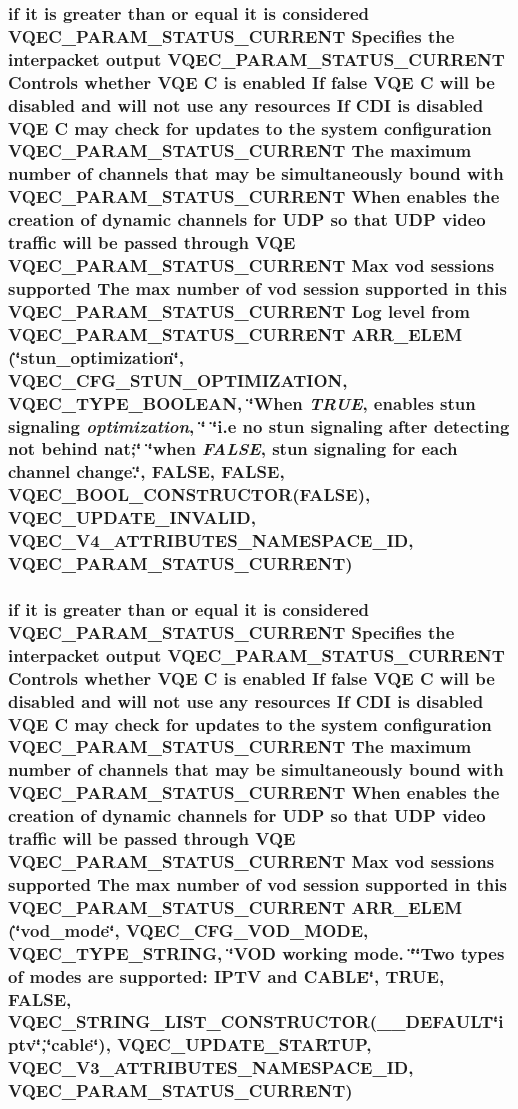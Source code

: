 \subsubsection{\setlength{\rightskip}{0pt plus 5cm}if it is greater than or equal it is considered VQEC\_\-PARAM\_\-STATUS\_\-CURRENT Specifies the interpacket output VQEC\_\-PARAM\_\-STATUS\_\-CURRENT Controls whether VQE \bf{C} is enabled If false VQE \bf{C} will be disabled and will not use any resources If CDI is disabled VQE \bf{C} may check for updates \bf{to} the system configuration VQEC\_\-PARAM\_\-STATUS\_\-CURRENT The maximum number of \bf{channels} that may be simultaneously bound with VQEC\_\-PARAM\_\-STATUS\_\-CURRENT When enables the creation of dynamic \bf{channels} for UDP so that UDP video traffic will be passed through VQE VQEC\_\-PARAM\_\-STATUS\_\-CURRENT Max vod sessions supported The max number of vod session supported in \bf{this} VQEC\_\-PARAM\_\-STATUS\_\-CURRENT Log level from VQEC\_\-PARAM\_\-STATUS\_\-CURRENT ARR\_\-ELEM (\char`\"{}stun\_\-optimization\char`\"{}, VQEC\_\-CFG\_\-STUN\_\-OPTIMIZATION, \bf{VQEC\_\-TYPE\_\-BOOLEAN}, \char`\"{}When  {\em TRUE}, enables stun signaling {\em optimization}, \char`\"{} \char`\"{}i.e no stun signaling after detecting not behind nat;\char`\"{} \char`\"{}when {\em FALSE}, stun signaling for each channel change.\char`\"{}, \bf{FALSE}, \bf{FALSE}, VQEC\_\-BOOL\_\-CONSTRUCTOR(\bf{FALSE}), \bf{VQEC\_\-UPDATE\_\-INVALID}, \bf{VQEC\_\-V4\_\-ATTRIBUTES\_\-NAMESPACE\_\-ID}, VQEC\_\-PARAM\_\-STATUS\_\-CURRENT)}\label{vqec__cfg__settings_8h_ac293a6c6286d07d44597c8c3e80469e}


\subsubsection{\setlength{\rightskip}{0pt plus 5cm}if it is greater than or equal it is considered VQEC\_\-PARAM\_\-STATUS\_\-CURRENT Specifies the interpacket output VQEC\_\-PARAM\_\-STATUS\_\-CURRENT Controls whether VQE \bf{C} is enabled If false VQE \bf{C} will be disabled and will not use any resources If CDI is disabled VQE \bf{C} may check for updates \bf{to} the system configuration VQEC\_\-PARAM\_\-STATUS\_\-CURRENT The maximum number of \bf{channels} that may be simultaneously bound with VQEC\_\-PARAM\_\-STATUS\_\-CURRENT When enables the creation of dynamic \bf{channels} for UDP so that UDP video traffic will be passed through VQE VQEC\_\-PARAM\_\-STATUS\_\-CURRENT Max vod sessions supported The max number of vod session supported in \bf{this} VQEC\_\-PARAM\_\-STATUS\_\-CURRENT ARR\_\-ELEM (\char`\"{}vod\_\-mode\char`\"{}, VQEC\_\-CFG\_\-VOD\_\-MODE, \bf{VQEC\_\-TYPE\_\-STRING}, \char`\"{}VOD working mode. \char`\"{}\char`\"{}Two types of modes are supported: IPTV and CABLE\char`\"{}, \bf{TRUE}, \bf{FALSE}, VQEC\_\-STRING\_\-LIST\_\-CONSTRUCTOR(\_\-\_\-DEFAULT\char`\"{}iptv\char`\"{},\char`\"{}cable\char`\"{}), \bf{VQEC\_\-UPDATE\_\-STARTUP}, \bf{VQEC\_\-V3\_\-ATTRIBUTES\_\-NAMESPACE\_\-ID}, VQEC\_\-PARAM\_\-STATUS\_\-CURRENT)}\label{vqec__cfg__settings_8h_3bf308d81580ddca11c3437b7b2980b8}


